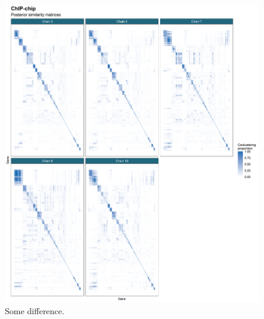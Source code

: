 \documentclass[]{article}
\begin{document}
\begin{figure}
	\centering
	\includegraphics[scale=0.5]{../Images/Yeast/ChIP-chipPSMcomparisonReduced.png}
	\caption{Some difference.}
	\label{fig:chipchipPSMs}
\end{figure}
\end{document}
